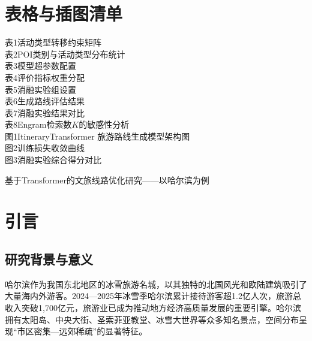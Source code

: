 \documentclass[12pt,a4paper]{ctexart}
\newcommand{\xiaobiao}{\CJKfamily{xbs}}
\newcommand{\xiaobiao}{\heiti}
\begin{document}
\section*{\centering\heiti\fontsize{14pt}{24pt}\selectfont 表格与插图清单}
{\songti\fontsize{12pt}{24pt}\selectfont
\noindent 表1\quad 活动类型转移约束矩阵\\[3pt]
\noindent 表2\quad POI类别与活动类型分布统计\\[3pt]
\noindent 表3\quad 模型超参数配置\\[3pt]
\noindent 表4\quad 评价指标权重分配\\[3pt]
\noindent 表5\quad 消融实验组设置\\[3pt]
\noindent 表6\quad 生成路线评估结果\\[3pt]
\noindent 表7\quad 消融实验结果对比\\[3pt]
\noindent 表8\quad Engram检索数$K$的敏感性分析\\[9pt]
\noindent 图1\quad ItineraryTransformer 旅游路线生成模型架构图\\[3pt]
\noindent 图2\quad 训练损失收敛曲线\\[3pt]
\noindent 图3\quad 消融实验综合得分对比\\
}
\newpage

\setcounter{page}{1}

\begin{center}
{\xiaobiao\fontsize{16pt}{24pt}\selectfont 基于Transformer的文旅线路优化研究——以哈尔滨为例}
\end{center}

\section{引言}

\subsection{研究背景与意义}

哈尔滨作为我国东北地区的冰雪旅游名城，以其独特的北国风光和欧陆建筑吸引了大量海内外游客。2024—2025年冰雪季哈尔滨累计接待游客超1.2亿人次，旅游总收入突破1,700亿元，旅游业已成为推动地方经济高质量发展的重要引擎。哈尔滨拥有太阳岛、中央大街、圣索菲亚教堂、冰雪大世界等众多知名景点，空间分布呈现“市区密集—远郊稀疏”的显著特征。
\end{document}
